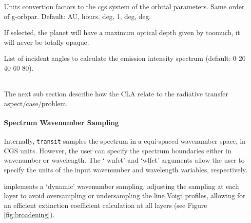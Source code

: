 \documentclass[letterpaper, 12pt]{article}
\begin{document}
 \newline
{}


{Units convertion factors to the cgs system of the orbital
  parameters. Same order of g-orbpar.  Default: AU, hours, deg, 1,
  deg, deg.}

 {If selected, the planet will have a maximum
  optical depth given by toomuch, it will never be totally opaque.}

 {List of incident angles to
  calculate the emission intensity spectrum (default: 0 20 40 60 80).}


 \\
The next sub section describe how the CLA relate to the radiative
transfer aspect/case/problem.

\paragraph{Spectrum Wavenumber Sampling}

Internally, {\tt transit} samples the spectrum in a equi-spaced
wavenumber space, in CGS units.  However, the user can specify the
spectrum boundaries either in wavenumber or wavelength.  The `{\tttb
  wnfct}' and `{\tttb wlfct}' arguments allow the user to specify the
units of the input wavenumber and wavelength variables, respectively.

{\transit} implements a `dynamic' wavenumber sampling, adjusting the
sampling at each layer to avoid oversampling or undersampling the line
Voigt profiles, allowing for an efficient extinction coefficient
calculation at all layers (see Figure \ref{fig:broadening}).
\end{document}
